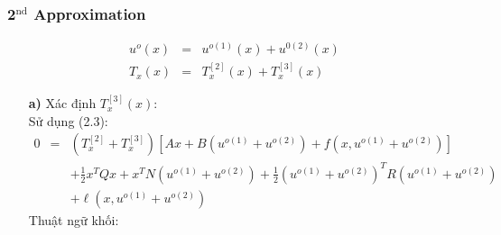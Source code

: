 \documentclass[12pt,a4paper]{report}
\begin{document}
\subsubsection{2$^\text{nd}$ Approximation}
\begin{eqnarray}
	u^o(x) &=& u^{o(1)}(x) + u^{0(2)}(x)\nonumber \\ T_x(x) &=& T_x^{[2]}(x) + T_x^{[3]}(x) \nonumber
\end{eqnarray}
\begin{itemize}
	\item[\textbf{a)}] Xác định $T_x^{[3]}(x)$: \\ Sử dụng (2.3): \begin{eqnarray}
		0 &=& (T_x^{[2]} + T_x^{[3]})[Ax + B(u^{o(1)} + u^{o(2)}) + f(x, u^{o(1)} + u^{o(2)})] \nonumber \\ && + \frac{1}{2}x^TQx + x^TN(u^{o(1)} + u^{o(2)}) + \frac{1}{2}(u^{o(1)} + u^{o(2)})^TR(u^{o(1)} + u^{o(2)}) \nonumber \\ && + \ell(x, u^{o(1)} + u^{o(2)}) \nonumber
	\end{eqnarray} Thuật ngữ khối: 
\end{itemize}
\end{document}
